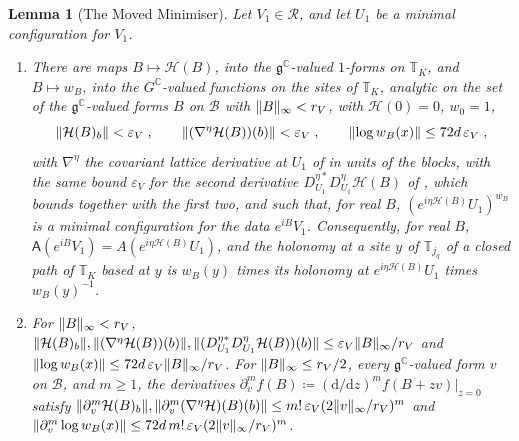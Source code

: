 \documentclass[11pt]{preprint}
\newcommand{\dd}{\mathrm{d}}
\DeclarePairedDelimiter{\norm}{\lVert}{\rVert}
\numberwithin{equation}{section}
\newtheorem{lemma}[theorem]{Lemma}
\theoremstyle{definition}
\theoremstyle{remark}
\theoremstyle{plain}
\begin{document}
\begin{lemma}[The Moved Minimiser]\label{lem:moved-minimiser}
Let $V_1 \in \mathcal R$, and let $U_1$ be a minimal configuration for $V_1$.
\begin{enumerate}[label=(\roman*)]
\item There are maps $B \mapsto \mathcal H(B)$, into the $\mathfrak g^{\mathbb C}$-valued $1$-forms on $\mathbb T_K$, and $B \mapsto w_B$, into the $G^{\mathbb C}$-valued functions on the sites of $\mathbb T_K$, analytic on the set of the $\mathfrak g^{\mathbb C}$-valued forms $B$ on $\mathcal B$ with $\norm B_\infty < r_V$, with $\mathcal H(0) = 0$, $w_0 = 1$,
\begin{equation}\label{eq:moved-minimiser-bounds}
    \norm{\mathcal H(B)_b} < \varepsilon_V\;,
    \qquad
    \norm{(\nabla^\eta\mathcal H(B))(b)} < \varepsilon_V\;,
    \qquad
    \norm{\log w_B(x)} \leq 72d\,\varepsilon_V\;,
\end{equation}
with $\nabla^\eta$ the covariant lattice derivative at $U_1$ of \cite[(19), p.~281]{BalabanVAR} in units of the blocks, with the same bound $\varepsilon_V$ for the second derivative $D^{\eta*}_{U_1}D^\eta_{U_1}\mathcal H(B)$ of \cite[(19)]{BalabanVAR}, which \cite[Proposition~9, p.~309]{BalabanVAR} bounds together with the first two, and such that, for real $B$, $(e^{i\eta\mathcal H(B)}U_1)^{w_B}$ is a minimal configuration for the data $e^{iB}V_1$. Consequently, for real $B$, $\mathsf A(e^{iB}V_1) = A(e^{i\eta\mathcal H(B)}U_1)$, and the holonomy at a site $y$ of $\mathbb T_{j_q}$ of a closed path of $\mathbb T_K$ based at $y$ is $w_B(y)$ times its holonomy at $e^{i\eta\mathcal H(B)}U_1$ times $w_B(y)^{-1}$.
\item For $\norm B_\infty < r_V$, $\norm{\mathcal H(B)_b}, \norm{(\nabla^\eta\mathcal H(B))(b)}, \norm{(D^{\eta*}_{U_1}D^\eta_{U_1}\mathcal H(B))(b)} \leq \varepsilon_V\norm B_\infty/r_V$ and $\norm{\log w_B(x)} \leq 72d\,\varepsilon_V\norm B_\infty/r_V$. For $\norm B_\infty \leq r_V/2$, every $\mathfrak g^{\mathbb C}$-valued form $v$ on $\mathcal B$, and $m \geq 1$, the derivatives $\partial^m_vf(B) \coloneqq (\dd/\dd z)^mf(B + zv)|_{z=0}$ satisfy $\norm{\partial^m_v\mathcal H(B)_b}, \norm{\partial^m_v(\nabla^\eta\mathcal H)(B)(b)} \leq m!\,\varepsilon_V(2\norm v_\infty/r_V)^m$ and $\norm{\partial^m_v\log w_B(x)} \leq 72d\,m!\,\varepsilon_V(2\norm v_\infty/r_V)^m$.
\end{enumerate}
\end{lemma}
\end{document}
